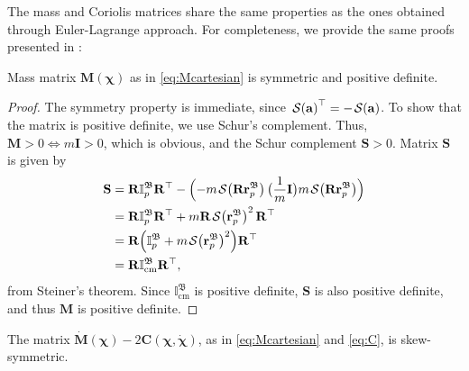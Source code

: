 The mass and Coriolis matrices share the same properties as the ones obtained through Euler-Lagrange approach. For completeness, we provide the same proofs presented in \citet{Culbertson2021}:
\begin{lemma}\label{lemma:mass-matrix-definite-positive}
    Mass matrix $\mathbf{M}(\boldsymbol{\chi})$ as in \eqref{eq:Mcartesian} is symmetric and positive definite.
\end{lemma}
\begin{proof}
    The symmetry property is immediate, since $\SL[\mathbf{a}]^\top=-\SL[\mathbf{a}]$. To show that the matrix is positive definite, we use Schur's complement. Thus, $\mathbf{M}>0 \iff m\mathbf{I}>0$, which is obvious, and the Schur complement $\mathbf{S} > 0$. Matrix $\mathbf{S}$ is given by
    \begin{align}
        \begin{split}
            \mathbf{S}&=\mathbf{R}\mathbb{I}_p^\mathfrak{B}\mathbf{R}^\top - \Bigl(-m\SL[\mathbf{R}\mathbf{r}_p^\mathfrak{B}]\bigl(\frac{1}{m}\mathbf{I}\bigr)m\SL[\mathbf{R}\mathbf{r}_p^\mathfrak{B}]\Bigr)\\
            &=\mathbf{R}\mathbb{I}_p^\mathfrak{B}\mathbf{R}^\top + m\mathbf{R}\SL[\mathbf{r}_p^\mathfrak{B}]^2\mathbf{R}^\top\\
            &=\mathbf{R}\Bigl(\mathbb{I}_p^\mathfrak{B} + m\SL[\mathbf{r}_p^\mathfrak{B}]^2\Bigr)\mathbf{R}^\top\\
            &=\mathbf{R}\mathbb{I}_\text{cm}^\mathfrak{B}\mathbf{R}^\top,
        \end{split}
    \end{align}
    from Steiner's theorem. Since $\mathbb{I}_\text{cm}^\mathfrak{B}$ is positive definite, $\mathbf{S}$ is also positive definite, and thus $\mathbf{M}$ is positive definite.
\end{proof}
\begin{lemma}\label{lemma:coriolis-matrix-skew-symmetric}
    The matrix $\dot{\mathbf{M}}(\boldsymbol{\chi}) - 2\mathbf{C}(\boldsymbol{\chi},\dot{\boldsymbol{\chi}})$, as in \eqref{eq:Mcartesian} and \eqref{eq:C}, is skew-symmetric.
\end{lemma}
